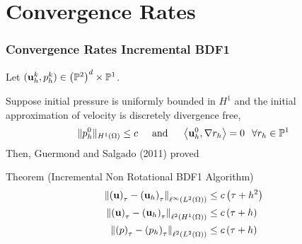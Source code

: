 \documentclass{beamer}
\begin{document}
%
%
%
\section[Convergence]{Convergence Rates}

\begin{frame}
  \frametitle{Convergence Rates Incremental BDF1} 
  Let $(\textbf{u}_h^k, p_h^{k})\in \left(\mathbb{P}^2\right)^{d}\times\mathbb{P}^1$.  \newline
  
  Suppose initial pressure is uniformly bounded in $H^1$ and the initial approximation of velocity is discretely divergence free,
  \begin{equation*}
    \|p_h^0\|_{H^1(\Omega)} \leq c \hspace{0.5cm} \mbox{and} \hspace{0.5cm} \left\langle \textbf{u}_h^0, \nabla r_h \right\rangle = 0 \hspace{0.25cm} \forall r_h\in \mathbb{P}^1
  \end{equation*}
    Then, Guermond and Salgado (2011) proved
  \begin{block}{Theorem (Incremental Non Rotational BDF1 Algorithm)}
    \begin{align*}
      \left\|\left(\textbf{u}\right)_{\tau} - \left(\textbf{u}_h\right)_{\tau}\right\|_{\ell^{\infty}\left(L^2(\Omega)\right)} &\leq c\left( \tau + h^2\right)\\
      \left\|\left(\textbf{u}\right)_{\tau} - \left(\textbf{u}_h\right)_{\tau}\right\|_{\ell^{2}\left(H^1(\Omega)\right)} &\leq c\left(\tau + h \right)\\
      \left\|\left(p\right)_{\tau} - \left(p_h\right)_{\tau}\right\|_{\ell^{2}\left(L^2(\Omega)\right)} &\leq c\left(\tau + h \right)
    \end{align*}
  \end{block}
  
\end{frame}
\end{document}
